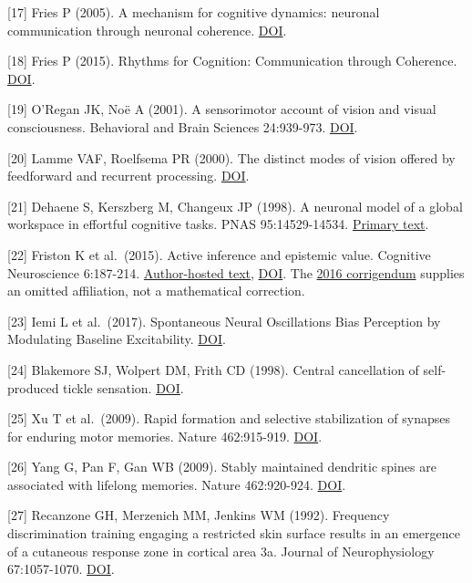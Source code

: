 \documentclass[
  american,
  11pt,
  letterpaper,
]{article}
\begin{document}
{[}17{]} Fries P (2005). A mechanism for cognitive dynamics: neuronal communication through neuronal coherence. \href{https://doi.org/10.1016/j.tics.2005.08.011}{DOI}.

{[}18{]} Fries P (2015). Rhythms for Cognition: Communication through Coherence. \href{https://doi.org/10.1016/j.neuron.2015.09.034}{DOI}.

{[}19{]} O'Regan JK, Noë A (2001). A sensorimotor account of vision and visual consciousness. Behavioral and Brain Sciences 24:939-973. \href{https://doi.org/10.1017/S0140525X01000115}{DOI}.

{[}20{]} Lamme VAF, Roelfsema PR (2000). The distinct modes of vision offered by feedforward and recurrent processing. \href{https://doi.org/10.1016/S0166-2236(00)01657-X}{DOI}.

{[}21{]} Dehaene S, Kerszberg M, Changeux JP (1998). A neuronal model of a global workspace in effortful cognitive tasks. PNAS 95:14529-14534. \href{https://pmc.ncbi.nlm.nih.gov/articles/PMC24407/}{Primary text}.

{[}22{]} Friston K et al.~(2015). Active inference and epistemic value. Cognitive Neuroscience 6:187-214. \href{https://www.fil.ion.ucl.ac.uk/~karl/Active\%20inference\%20and\%20epistemic\%20value.pdf}{Author-hosted text}, \href{https://doi.org/10.1080/17588928.2015.1020053}{DOI}. The \href{https://doi.org/10.1080/17588928.2016.1164961}{2016 corrigendum} supplies an omitted affiliation, not a mathematical correction.

{[}23{]} Iemi L et al.~(2017). Spontaneous Neural Oscillations Bias Perception by Modulating Baseline Excitability. \href{https://doi.org/10.1523/JNEUROSCI.1432-16.2016}{DOI}.

{[}24{]} Blakemore SJ, Wolpert DM, Frith CD (1998). Central cancellation of self-produced tickle sensation. \href{https://doi.org/10.1038/2870}{DOI}.

{[}25{]} Xu T et al.~(2009). Rapid formation and selective stabilization of synapses for enduring motor memories. Nature 462:915-919. \href{https://doi.org/10.1038/nature08389}{DOI}.

{[}26{]} Yang G, Pan F, Gan WB (2009). Stably maintained dendritic spines are associated with lifelong memories. Nature 462:920-924. \href{https://doi.org/10.1038/nature08577}{DOI}.

{[}27{]} Recanzone GH, Merzenich MM, Jenkins WM (1992). Frequency discrimination training engaging a restricted skin surface results in an emergence of a cutaneous response zone in cortical area 3a. Journal of Neurophysiology 67:1057-1070. \href{https://doi.org/10.1152/jn.1992.67.5.1057}{DOI}.
\end{document}
